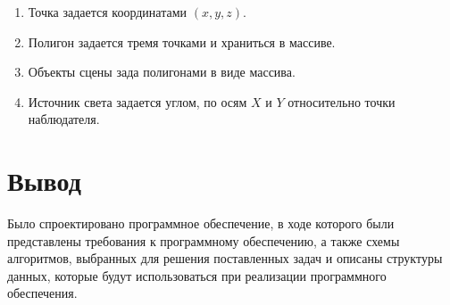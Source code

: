 \begin{enumerate}
	\item Точка задается координатами $(x, y, z)$.
	\item Полигон задается тремя точками и храниться в массиве.
	\item Объекты сцены зада полигонами в виде массива.
	\item Источник света задается углом, по осям $X$ и $Y$ относительно точки наблюдателя. 
\end{enumerate}


\section*{Вывод}

Было спроектировано программное обеспечение, в ходе которого были представлены требования к программному обеспечению, а также схемы алгоритмов, выбранных для решения поставленных задач и описаны структуры данных, которые будут использоваться при реализации программного обеспечения.

